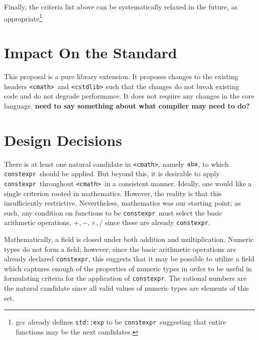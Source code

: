 \documentclass[prd,preprint,amsmath,amssymb,nofootinbib,eqsecnum]{revtex4-1}
\newcommand{\code}[1]{{\tt #1}}
\newcommand{\constexpr}{\code{constexpr}}
\newcommand{\header}[1]{{\tt <#1>}}
\newcommand{\cmath}{\header{cmath}}
\begin{document}
Finally, the criteria list above can be systematically relaxed in the future, as appropriate\footnote{gcc already defines \code{std::exp} to be \constexpr\ suggesting that entire functions may be the next candidates.}

\section{Impact On the Standard}

This proposal is a pure library extension. It proposes changes to the existing headers \cmath\ and \header{cstdlib} such that the changes do not break existing code and do not degrade performance. It does not require any changes in the core language. {\bf need to say something about what compiler may need to do?}


\section{Design Decisions}

There is at least one natural candidate in \header{cmath}, namely $\code{abs}$, to which \constexpr\ should be applied. But beyond this, it is desirable to apply \constexpr\ throughout \cmath\ in a consistent manner. Ideally, one would like a single criterion rooted in mathematics. However, the reality is that this insufficiently restrictive. Nevertheless, mathematics was our starting point; as such, any condition on functions to be \constexpr\ must select the basic arithmetic operations, $+,-,\times,/$ since these are already \constexpr.

Mathematically, a field is closed under both addition and multiplication. Numeric types do not form a field; however, since the basic arithmetic operations are already declared \constexpr, this suggests that it may be possible to utilize a field which captures enough of the properties of numeric types in order to be useful in formulating criteria for the application of \constexpr. The rational numbers are the natural candidate since all valid values of numeric types are elements of this set. 
\end{document}

